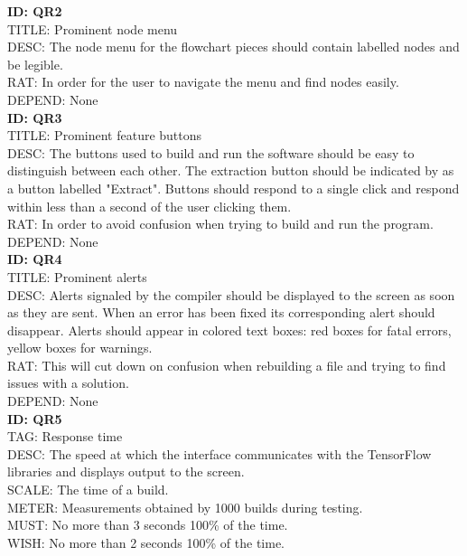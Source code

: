 \documentclass[journal,10pt,onecolumn,compsoc]{IEEEtran} \usepackage[margin=1.0in]{geometry} \usepackage{pdfpages} \usepackage{graphicx}
\begin{document}
\noindent
\textbf{ID: QR2}\\
TITLE: Prominent node menu\\
DESC: The node menu for the flowchart pieces should contain labelled nodes and be legible.\\
RAT: In order for the user to navigate the menu and find nodes easily.\\
DEPEND: None\\

\noindent
\textbf{ID: QR3}\\
TITLE: Prominent feature buttons\\
DESC: The buttons used to build and run the software should be easy to distinguish between each other. 
The extraction button should be indicated by as a button labelled "Extract".
Buttons should respond to a single click and respond within less than a second of the user clicking them.\\
RAT: In order to avoid confusion when trying to build and run the program.\\
DEPEND: None\\

\noindent
\textbf{ID: QR4}\\
TITLE: Prominent alerts\\
DESC: Alerts signaled by the compiler should be displayed to the screen as soon as they are sent. 
When an error has been fixed its corresponding alert should disappear.
Alerts should appear in colored text boxes: red boxes for fatal errors, yellow boxes for warnings.\\
RAT: This will cut down on confusion when rebuilding a file and trying to find issues with a solution.\\
DEPEND: None\\

\noindent
\textbf{ID: QR5}\\
TAG: Response time\\
DESC: The speed at which the interface communicates with the TensorFlow libraries and displays output to the screen.\\
SCALE: The time of a build.\\
METER: Measurements obtained by 1000 builds during testing.\\
MUST: No more than 3 seconds 100\% of the time.\\
WISH: No more than 2 seconds 100\% of the time.\\

\newpage
\end{document}

